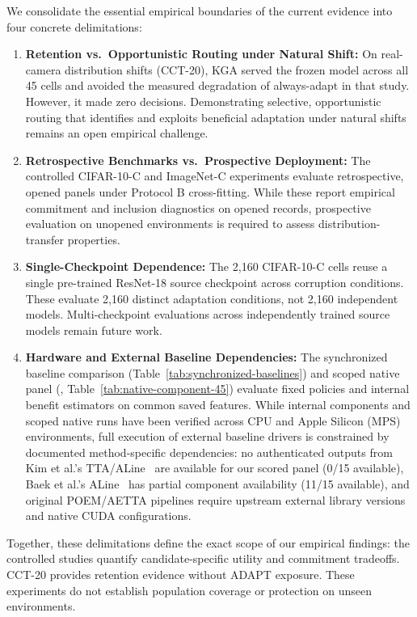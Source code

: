 We consolidate the essential empirical boundaries of the current evidence into four concrete delimitations:
\begin{enumerate}
  \item \textbf{Retention vs.\ Opportunistic Routing under Natural Shift:} On real-camera distribution shifts
  (CCT-20), KGA served the frozen model across all 45 cells and avoided the measured degradation of always-adapt
  in that study. However, it made zero \adapt decisions. Demonstrating selective, opportunistic routing that
  identifies and exploits beneficial adaptation under natural shifts remains an open empirical challenge.
  \item \textbf{Retrospective Benchmarks vs.\ Prospective Deployment:} The controlled CIFAR-10-C and ImageNet-C
  experiments evaluate retrospective, opened panels under Protocol B cross-fitting. While these report empirical
  commitment and inclusion diagnostics on opened records, prospective evaluation on unopened environments is
  required to assess distribution-transfer properties.
  \item \textbf{Single-Checkpoint Dependence:} The 2,160 CIFAR-10-C cells reuse a single pre-trained
  ResNet-18 source checkpoint across corruption conditions. These evaluate 2,160 distinct adaptation conditions,
  not 2,160 independent models. Multi-checkpoint evaluations across independently trained source models remain
  future work.
  \item \textbf{Hardware and External Baseline Dependencies:} The synchronized baseline comparison
  (Table~\ref{tab:synchronized-baselines}) and scoped native panel
  (, Table~\ref{tab:native-component-45}) evaluate fixed policies and
  internal benefit estimators on common saved features. While internal components and scoped native runs have been
  verified across CPU and Apple Silicon (MPS) environments, full execution of external baseline drivers is
  constrained by documented method-specific dependencies: no authenticated outputs from Kim et al.'s TTA/ALine~\cite{kim2024ttaline} are available for our scored panel (0/15 available), Baek et al.'s ALine~\cite{baek2022aol} has partial component availability (11/15 available),
  and original POEM/AETTA pipelines require upstream external library versions and native CUDA configurations.
\end{enumerate}
Together, these delimitations define the exact scope of our empirical findings: the controlled studies
quantify candidate-specific utility and commitment tradeoffs. CCT-20 provides retention evidence without
ADAPT exposure. These experiments do not establish population coverage or protection on unseen environments.

